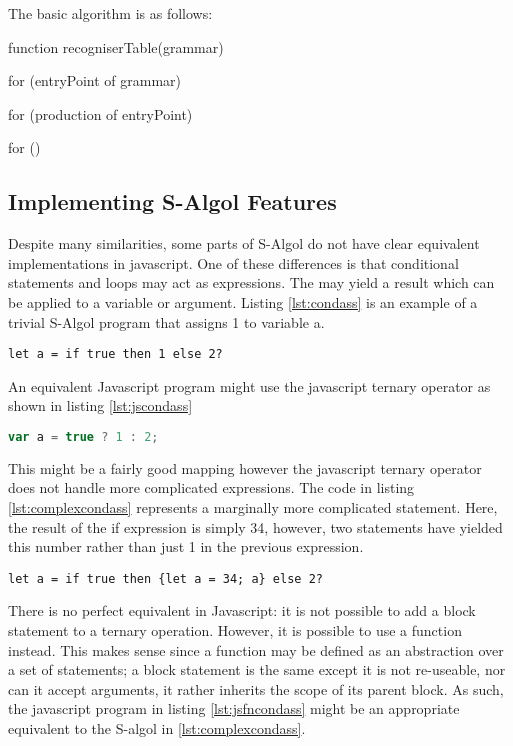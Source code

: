 \documentclass{article}
\begin{document}
The basic algorithm is as follows:

function recogniserTable(grammar) {
	for (entryPoint of grammar) {
		for (production of entryPoint) {
			for () {
			
			}
		}
	}
}

\subsection{Implementing S-Algol Features}

Despite many similarities, some parts of S-Algol do not have clear equivalent implementations in javascript. One of these differences is that conditional statements and loops may act as expressions. The may yield a result which can be applied to a variable or argument. Listing \ref{lst:condass} is an example of a trivial S-Algol program that assigns 1 to variable a.

\begin{lstlisting}[caption={S-Algol conditional assignment},label={lst:condass}]
let a = if true then 1 else 2?
\end{lstlisting}

An equivalent Javascript program might use the javascript ternary operator as shown in listing \ref{lst:jscondass}

\begin{lstlisting}[caption={Javascript conditional assignment},label={lst:jscondass}, language=javascript]
var a = true ? 1 : 2;
\end{lstlisting}

This might be a fairly good mapping however the javascript ternary operator does not handle more complicated expressions. The code in listing \ref{lst:complexcondass} represents a marginally more complicated statement. Here, the result of the if expression is simply 34, however, two statements have yielded this number rather than just 1 in the previous expression.

\begin{lstlisting}[caption={More complicated S-Algol conditional assignment},label={lst:complexcondass}]
let a = if true then {let a = 34; a} else 2?
\end{lstlisting}

There is no perfect equivalent in Javascript: it is not possible to add a block statement to a ternary operation. However, it is possible to use a function instead. This makes sense since a function may be defined as an abstraction over a set of statements; a block statement is the same except it is not re-useable, nor can it accept arguments, it rather inherits the scope of its parent block. As such, the javascript program in listing \ref{lst:jsfncondass} might be an appropriate equivalent to the S-algol in \ref{lst:complexcondass}.
\end{document}
